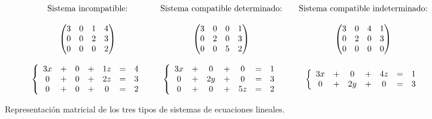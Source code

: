 \begin{figure}[h!]
\[
	\begin{array}{c cc c cc c}
		\text{Sistema incompatible:} && \text{Sistema compatible determinado:} && \text{Sistema compatible indeterminado:}

		\\ && && && \\

		\begin{pmatrix}
			3 & 0 & 1 & 4 \\
			0 & 0 & 2 & 3 \\
			0 & 0 & 0 & 2
		\end{pmatrix}

		&&

		\begin{pmatrix}
			3 & 0 & 0 & 1 \\
			0 & 2 & 0 & 3 \\
			0 & 0 & 5 & 2
		\end{pmatrix}

		&&

		\begin{pmatrix}
			3 & 0 & 4 & 1 \\
			0 & 2 & 0 & 3 \\
			0 & 0 & 0 & 0
		\end{pmatrix}

		\\ && && && \\

		\left\{
		\begin{array}{cc cc cc c}
			3x & + & 0 & + & 1z & = & 4 \\
			0  & + & 0 & + & 2z & = & 3 \\
			0  & + & 0 & + & 0  & = & 2
		\end{array}
		\right.

		&&

		\left\{
		\begin{array}{cc cc cc c}
			3x & + & 0  & + & 0  & = & 1 \\
			0  & + & 2y & + & 0  & = & 3 \\
			0  & + & 0  & + & 5z & = & 2
		\end{array}
		\right.

		&&

		\left\{
		\begin{array}{cc cc cc c}
			3x & + & 0  & + & 4z & = & 1 \\
			0  & + & 2y & + & 0  & = & 3 \\
		\end{array}
		\right.
	\end{array}
\]
\caption{Representación matricial de los tres tipos de sistemas de ecuaciones lineales.}
\end{figure}

